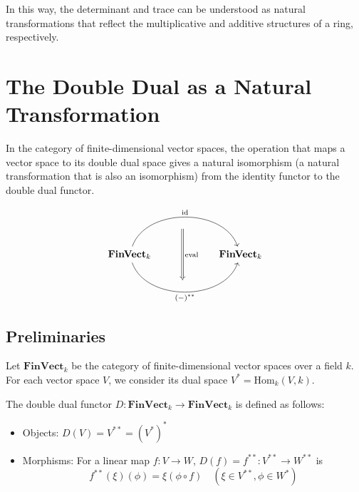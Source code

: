 \documentclass[uplatex,a4j,12pt,dvipdfmx]{jsarticle}
\begin{document}
In this way, the determinant and trace can be understood as natural transformations that reflect the multiplicative and additive structures of a ring, respectively.





\section{The Double Dual as a Natural Transformation}

In the category of finite-dimensional vector spaces, the operation that maps a vector space to its double dual space gives a natural isomorphism (a natural transformation that is also an isomorphism) from the identity functor to the double dual functor.

\[
	\begin{tikzcd}
		& {} \arrow[dd, "\text{eval}", Rightarrow, shift right] &                      \\
		\textbf{FinVect}_{k} \arrow[rr, "\text{id}", bend left=71] \arrow[rr, "(-)^{**}"', bend right=71] &                                                       & \textbf{FinVect}_{k} \\
		& {}                                                    &
	\end{tikzcd}
\]

\subsection{Preliminaries}

Let $\mathbf{FinVect}_k$ be the category of finite-dimensional vector spaces over a field $k$.
For each vector space $V$, we consider its dual space $V^* = \mathrm{Hom}_k(V, k)$.

The double dual functor $D: \mathbf{FinVect}_k \to \mathbf{FinVect}_k$ is defined as follows:
\begin{itemize}
	\item Objects: $D(V) = V^{**} = (V^*)^*$
	\item Morphisms: For a linear map $f: V \to W$, $D(f) = f^{**}: V^{**} \to W^{**}$ is
	      \[
		      f^{**}(\xi)(\phi) = \xi(\phi \circ f) \quad (\xi \in V^{**}, \phi \in W^*)
	      \]
\end{itemize}
\end{document}
